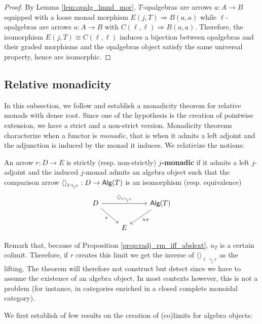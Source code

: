 \documentclass[10pt,a4paper]{article}
\newcommand{\cat}[1]{\textcat{#1}}
\newcommand{\textcat}[1]{{\normalfont\textsf{#1}}}
\newcommand{\To}{\Rightarrow}
\newcommand{\simeqq}{\cong}
\newcommand{\tp}[1]{\langle#1\rangle}
\newcommand{\unit}{{\tp{}}}
\DeclareMathOperator{\Alg}{\cat{Alg}}
\theoremstyle{plain}
\theoremstyle{definition}
\theoremstyle{remark}
\begin{document}
\begin{proof}
    By Lemma \ref{lem:opalg_lmnd_mor}, $T$-opalgebras are arrows $a : A \to B$ equipped with a loose monad morphism $E(j, T) \To B(a, a)$ while $\ell$-opalgebras are arrows $a : A \to B$ with $C(\ell, \ell) \To B(a, a)$. Therefore, the isomorphism $E(j, T) \simeqq C(\ell, \ell)$ induces a bijection between opalgebras and their graded morphisms and the opalgebras object satisfy the same universal property, hence are isomorphic.
\end{proof}

\subsection{Relative monadicity}
\label{subsec:rel_monadicity}

In this subsection, we follow \cite{arkor2025relativemonadicity} and establish a monadicity theorem for relative monads with dense root. Since one of the hypothesis is the creation of pointwise extension, we have a strict and a non-strict version. Monadicity theorems characterize when a functor is \textit{monadic}, that is when it admits a left adjoint and the adjunction is induced by the monad it induces. We relativize the notions:

\begin{definition}
    \label{def:monadic}
    An arrow $r : D \to E$ is strictly (resp. non-strictly) \textbf{$j$-monadic} if it admits a left $j$-adjoint and the induced $j$-monad admits an algebra object such that the comparison arrow $\unit_{\ell\dashv_jr} : D \to \Alg(T)$ is an isomorphism (resp. equivalence)
    \[\begin{tikzcd}
        \ar[dr, "r"'] D \ar[rr, "\unit_{\ell\dashv_jr}"] && \Alg(T) \ar[dl, "u_T"]\\
                                                         & E &
    \end{tikzcd}\]
\end{definition}

Remark that, because of Proposition \ref{prop:radj_rm_iff_abslext}, $u_T$ is a certain colimit. Therefore, if $r$ creates this limit we get the inverse of $\unit_{\ell\dashv_jr}$ as the lifting. The theorem will therefore not construct but detect since we have to assume the existence of an algebra object. In most contexts however, this is not a problem (for instance, in categories enriched in a closed complete monoidal category).

We first establish of few results on the creation of (co)limits for algebra objects:
\end{document}
